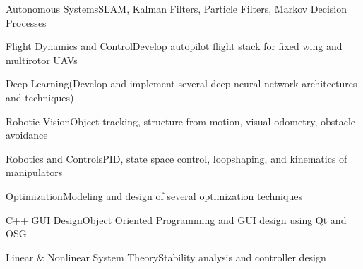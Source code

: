 
\begin{cventries}

    \begin{cvitems}
      \item {Autonomous Systems{\enskip\cdotp\enskip}SLAM, Kalman Filters, Particle Filters, Markov Decision Processes}
      \item {Flight Dynamics and Control{\enskip\cdotp\enskip}Develop autopilot flight stack for fixed wing and multirotor UAVs}
      \item {Deep Learning{\enskip\cdotp\enskip}(Develop and implement several deep neural network architectures and techniques)}
      \item {Robotic Vision{\enskip\cdotp\enskip}Object tracking, structure from motion, visual odometry, obstacle avoidance}
      \item {Robotics and Controls{\enskip\cdotp\enskip}PID, state space control, loopshaping, and kinematics of manipulators}
      \item {Optimization{\enskip\cdotp\enskip}Modeling and design of several optimization techniques}
      \item {C++ GUI Design{\enskip\cdotp\enskip}Object Oriented Programming and GUI design using Qt and OSG}
      \item {Linear \& Nonlinear System Theory{\enskip\cdotp\enskip}Stability analysis and controller design}
    \end{cvitems}

\end{cventries}
